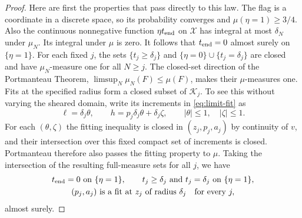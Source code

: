 \begin{proof}
Here are first the properties that pass directly to this law.  The flag is
a coordinate in a discrete space, so its probability converges and
$\mu(\eta=1)\ge3/4$.  Also the continuous nonnegative function
$\eta t_{\rm end}$ on $\mathcal X$ has integral at most $\delta_N$ under
$\mu_N$.  Its integral under $\mu$ is zero.  It follows that
$t_{\rm end}=0$ almost surely on $\{\eta=1\}$.  For each fixed $j$, the sets
$\{t_j\ge\delta_j\}$ and $\{\eta=0\}\cup\{t_j=\delta_j\}$ are closed and
have $\mu_N$-measure one for all $N\ge j$.  The closed-set direction of the
Portmanteau Theorem, $\limsup_N\mu_N(F)\le\mu(F)$, makes their
$\mu$-measures one.  Fits at the specified radius form a closed subset of
$\mathcal K_j$.  To see this without varying the sheared domain, write its
increments in \eqref{eq:limit-fit} as
\[
  \ell=\delta_j\theta,\qquad
  h=p_j\delta_j\theta+\delta_j\zeta,
  \qquad |\theta|\le1,\quad |\zeta|\le1.
\]
For each $(\theta,\zeta)$ the fitting inequality is closed in
$(z_j,p_j,a_j)$ by continuity of $v$, and their intersection over this
fixed compact set of increments is closed.  Portmanteau therefore also
passes the fitting property to $\mu$.  Taking the intersection of the
resulting full-measure sets for all $j$, we have
\begin{equation}\label{eq:contact-mark-limit}
\begin{gathered}
  t_{\rm end}=0\text{ on }\{\eta=1\},\qquad
  t_j\ge\delta_j\text{ and }t_j=\delta_j\text{ on }\{\eta=1\},\\
  (p_j,a_j)\text{ is a fit at }z_j\text{ of radius }\delta_j
       \quad\text{for every }j,
\end{gathered}
\end{equation}
almost surely.


\end{proof}
